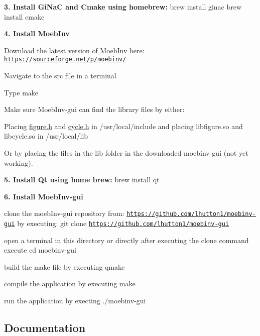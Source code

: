 {\bfseries 3. Install Gi\+NaC and Cmake using homebrew\+:} {\ttfamily brew install ginac brew install cmake}

{\bfseries 4. Install Moeb\+Inv}


\begin{DoxyItemize}
\item Download the latest version of Moeb\+Inv here\+: \href{https://sourceforge.net/p/moebinv/}{\tt https\+://sourceforge.\+net/p/moebinv/}
\item Navigate to the src file in a terminal
\item Type {\ttfamily make}
\item Make sure Moeb\+Inv-\/gui can find the library files by either\+:
\begin{DoxyItemize}
\item Placing {\ttfamily \mbox{\hyperlink{figure_8h_source}{figure.\+h}}} and {\ttfamily \mbox{\hyperlink{cycle_8h_source}{cycle.\+h}}} in {\ttfamily /usr/local/include} and placing {\ttfamily libfigure.\+so} and {\ttfamily libcycle.\+so} in {\ttfamily /usr/local/lib}
\item Or by placing the files in the lib folder in the downloaded moebinv-\/gui (not yet working).
\end{DoxyItemize}
\end{DoxyItemize}

{\bfseries 5. Install Qt using home brew\+:} {\ttfamily brew install qt}

{\bfseries 6. Install Moeb\+Inv-\/gui}
\begin{DoxyItemize}
\item clone the moeb\+Inv-\/gui repository from\+: \href{https://github.com/lhutton1/moebinv-gui}{\tt https\+://github.\+com/lhutton1/moebinv-\/gui} by executing\+: {\ttfamily git clone \href{https://github.com/lhutton1/moebinv-gui}{\tt https\+://github.\+com/lhutton1/moebinv-\/gui}}
\item open a terminal in this directory or directly after executing the clone command execute {\ttfamily cd moebinv-\/gui}
\item build the make file by executing {\ttfamily qmake}
\item compile the application by executing {\ttfamily make}
\item run the application by execting {\ttfamily ./moebinv-\/gui}
\end{DoxyItemize}

\subsection*{Documentation}

